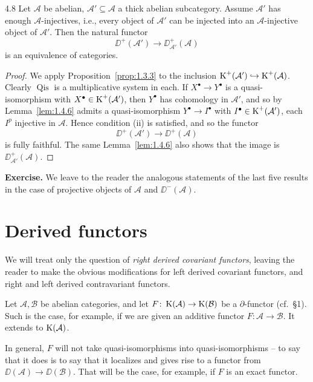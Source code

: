 \begin{bookproposition}{4.8}\label{prop:1.4.8}
Let $\mathcal{A}$ be abelian, $\mathcal{A}'\subseteq\mathcal{A}$ a thick abelian subcategory. Assume $\mathcal{A}'$ has enough $\mathcal{A}$-injectives, i.e., every object of $\mathcal{A}'$ can be injected into an
$\mathcal{A}$-injective object of $\mathcal{A}'$. Then the natural functor
\[
\DD^+(\mathcal{A}') \to \DD_{\mathcal{A}'}^+(\mathcal{A})
\]
is an equivalence of categories.
\end{bookproposition}

\begin{proof}
We apply Proposition~\ref{prop:1.3.3} to the inclusion $\operatorname{K}^+(\mathcal{A}')\hookrightarrow\operatorname{K}^+(\mathcal{A})$. Clearly $\operatorname{Qis}$ is a multiplicative system in each. If $X^\bullet\to Y^\bullet$ is a quasi-isomorphism with $X^\bullet\in\operatorname{K}^+(\mathcal{A}')$, then $Y^\bullet$ has cohomology in $\mathcal{A}'$, and so by Lemma~\ref{lem:1.4.6} admits a quasi-isomorphism $Y^\bullet\to I^\bullet$ with $I^\bullet\in\operatorname{K}^+(\mathcal{A}')$, each $I^p$ injective in $\mathcal{A}$. Hence condition (ii) is satisfied, and so the functor
\[
\DD^+(\mathcal{A}') \longrightarrow \DD^+(\mathcal{A})
\]
is fully faithful. The same Lemma~\ref{lem:1.4.6} also shows that the image is $\DD_{\mathcal{A}'}^+(\mathcal{A})$.
\end{proof}

\textbf{Exercise.} We leave to the reader the analogous statements of the last five results in the case of projective objects of $\mathcal{A}$ and $\DD^-(\mathcal{A})$.

\section{Derived functors}\label{sec:1.5}

We will treat only the question of \emph{right derived covariant functors}, leaving the reader to make the obvious modifications for left derived covariant functors, and right and left derived contravariant functors.

Let $\mathcal{A},\mathcal{B}$ be abelian categories, and let $F\colon\operatorname{K}(\mathcal{A})\to\operatorname{K}(\mathcal{B})$ be a $\partial$-functor (cf.\ \S1). Such is the case, for example, if we are given an additive functor $F\colon\mathcal{A}\to\mathcal{B}$. It extends to $\operatorname{K}(\mathcal{A})$.

In general, $F$ will not take quasi-isomorphisms into quasi-isomorphisms -- to say that it does is to say that it localizes
and gives rise to a functor from  $\DD(\mathcal{A})\to\DD(\mathcal{B})$. That will be the
case, for example, if $F$ is an exact functor.

